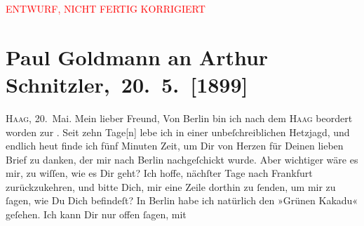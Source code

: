 
\begin{center}
            \textcolor{red}{ENTWURF, NICHT FERTIG KORRIGIERT}
                      \end{center}
            
         
         \newcommand{\erwaehntePersonen}{Personen: Alfred Kerr, Theodore Rottenberg}
         \newcommand{\erwaehnteOrte}{Orte: Berlin, Den Haag, Frankfurt am Main, Frankreich, Wien}
         \newcommand{\erwaehnteWerke}{Werke: Der grüne Kakadu. Groteske in einem Akt}
               \section[ Paul Goldmann an Arthur Schnitzler, 20. 5. {[}1899{]}]{ Paul Goldmann an Arthur Schnitzler, 20. 5. {[}1899{]}}\nopagebreak{}\rehead{ }\begin{ledgroupsized}[t]{13cm}\normalsize\beginnumbering \toendnotes[C]{\smallbreak\pagebreak[2]} 
\toendnotes[C]{\smallbreak}\pstart
           \raggedleft{}{\pb}\textsc{Haag}, 20. Mai.\pend
           \pstart{}Mein lieber Freund,\pend\pstart
           Von Berlin bin ich nach dem \textsc{Haag} beordert worden zur \label{K_L02875-1v}\label{K_L02875-1h}. Seit zehn Tage{[}n{]} lebe
               ich in einer unbeſchreiblichen Hetzjagd, und endlich heut finde ich fünf Minuten Zeit, um Dir von Herzen für Deinen lieben
               Brief zu danken, der mir nach Berlin
               nachgeſchickt wurde. Aber wichtiger wäre es mir, zu wiſſen, wie es Dir geht? Ich
               hoffe, nächſter Tage nach Frankfurt
               zurückzukehren, und bitte Dich, mir  eine Zeile
               dorthin zu ſenden, um mir zu ſagen, {\pb}wie Du Dich
               befindeſt?\pend
           \pstart
           In Berlin habe ich natürlich den »Grünen Kakadu« geſehen. Ich kann Dir nur offen ſagen, mit

\end{ledgroupsized}
